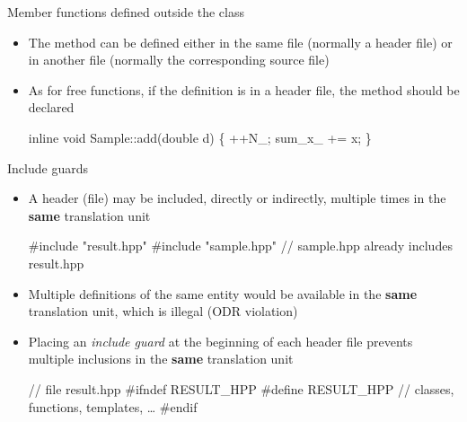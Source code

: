 \begin{frame}[fragile]{Member functions defined outside the class \insertcontinuationtext}

  \begin{itemize}
  \item The method can be defined either in the same file (normally a header
    file) or in another file (normally the corresponding source file)

  \item As for free functions, if the definition is in a header file,
    the method should be declared 

    \begin{codeblock}
\alert{inline} void Sample::add(double d) \{
  ++N_;
  sum_x_ += x;
  \ddd
\}\end{codeblock}

  \end{itemize}

\end{frame}

\begin{frame}[fragile]{Include guards}

  \begin{itemize}[<+->]
  \item A header (file) may be included, directly or indirectly, multiple times
    in the \textbf{same} translation unit
    \begin{codeblock}
#include "result.hpp"
#include "sample.hpp" // sample.hpp already includes result.hpp\end{codeblock}

  \item Multiple definitions of the same entity would be available in the
    \textbf{same} translation unit, which is illegal (ODR violation)
  \item Placing an \textit{include guard} at the beginning of each header file
    prevents multiple inclusions in the \textbf{same} translation unit
    \begin{codeblock}
// file result.hpp
#ifndef RESULT_HPP
#define RESULT_HPP
\ddd
// classes, functions, templates, \ldots
\ddd
#endif\end{codeblock}
  \end{itemize}
\end{frame}

